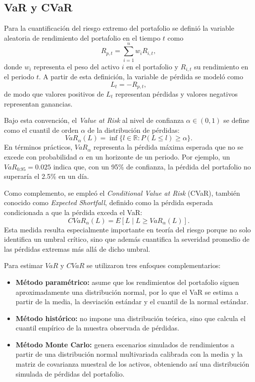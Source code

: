 \documentclass[11pt]{article}
\begin{document}
\subsection{VaR y CVaR}
Para la cuantificación del riesgo extremo del portafolio se definió la variable aleatoria de rendimiento del portafolio en el tiempo \(t\) como
\[
R_{p,t}=\sum_{i=1}^{n} w_i R_{i,t},
\]
donde \(w_i\) representa el peso del activo \(i\) en el portafolio y \(R_{i,t}\) su rendimiento en el periodo \(t\). A partir de esta definición, la variable de pérdida se modeló como
\[
L_t=-R_{p,t},
\]
de modo que valores positivos de \(L_t\) representan pérdidas y valores negativos representan ganancias.

Bajo esta convención, el \textit{Value at Risk} al nivel de confianza \(\alpha\in(0,1)\) se define como el cuantil de orden \(\alpha\) de la distribución de pérdidas:
\[
VaR_{\alpha}(L)=\inf\{l\in\mathbb{R}: P(L\leq l)\geq \alpha\}.
\]
En términos prácticos, \(VaR_{\alpha}\) representa la pérdida máxima esperada que no se excede con probabilidad \(\alpha\) en un horizonte de un periodo. Por ejemplo, un \(VaR_{0.95}=0.025\) indica que, con un 95\% de confianza, la pérdida del portafolio no superaría el 2.5\% en un día.

Como complemento, se empleó el \textit{Conditional Value at Risk} (CVaR), también conocido como \textit{Expected Shortfall}, definido como la pérdida esperada condicionada a que la pérdida exceda el VaR:
\[
CVaR_{\alpha}(L)=E[L \mid L \geq VaR_{\alpha}(L)].
\]
Esta medida resulta especialmente importante en teoría del riesgo porque no solo identifica un umbral crítico, sino que además cuantifica la severidad promedio de las pérdidas extremas más allá de dicho umbral.

Para estimar \(VaR\) y \(CVaR\) se utilizaron tres enfoques complementarios:
\begin{itemize}
    \item \textbf{Método paramétrico:} asume que los rendimientos del portafolio siguen aproximadamente una distribución normal, por lo que el VaR se estima a partir de la media, la desviación estándar y el cuantil de la normal estándar.
    \item \textbf{Método histórico:} no impone una distribución teórica, sino que calcula el cuantil empírico de la muestra observada de pérdidas.
    \item \textbf{Método Monte Carlo:} genera escenarios simulados de rendimientos a partir de una distribución normal multivariada calibrada con la media y la matriz de covarianza muestral de los activos, obteniendo así una distribución simulada de pérdidas del portafolio.
\end{itemize}
\end{document}
